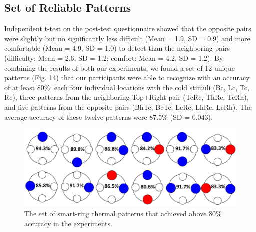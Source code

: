 \documentclass[preprint,12pt]{elsarticle}
\begin{document}
\subsection{Set of Reliable Patterns}
Independent t-test on the post-test questionnaire showed that the opposite pairs were slightly but no significantly less difficult (Mean = 1.9, SD = 0.9) and more comfortable (Mean = 4.9, SD = 1.0) to detect than the neighboring pairs (difficulty: Mean = 2.6, SD = 1.2; comfort: Mean = 4.2, SD = 1.2). By combining the results of both our experiments, we found a set of 12 unique patterns (Fig. 14) that our participants were able to recognize with an accuracy of at least 80\%: each four individual locations with the cold stimuli (Bc, Lc, Tc, Rc), three patterns from the neighboring Top+Right pair (TcRc, ThRc, TcRh), and five patterns from the opposite pairs (BhTc, BcTc, LcRc, LhRc, LcRh). The average accuracy of these twelve patterns were 87.5\% (SD = 0.043).


\begin{figure}[tp]
  \centering
  \includegraphics[width=0.9\columnwidth]{img/fig14.png}
  \caption{The set of smart-ring thermal patterns that achieved above 80\% accuracy in the experiments.}
  \label{fig:14}
\end{figure}
\end{document}
